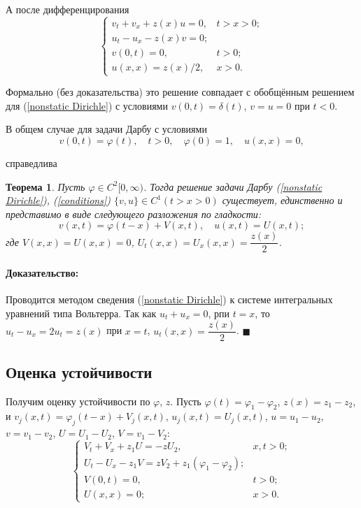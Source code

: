 \documentclass{article}
\newtheorem{theorem}{Теорема}
\newenvironment{proof}{\paragraph{Доказательство:}}{\hfill$\blacksquare$}
\begin{document}
А после дифференцирования
\begin{equation*}
\begin{cases}
	v_t + v_x + z(x) u = 0, & t > x > 0;\\
	u_t - u_x - z(x) v = 0; \\
	v(0,t) = 0, & t >0;\\
	u(x,x) = z(x) /2, & x > 0.
\end{cases}
\end{equation*}

Формально (без доказательства) это решение совпадает с обобщённым решением для (\ref{nonstatic Dirichle}) с условиями $v(0,t) = \delta(t)$, $v = u =0$ при $t<0$.

В общем случае для задачи Дарбу с условиями 
\begin{equation}
	v(0,t) = \varphi(t), \quad t>0, 
	\quad \varphi(0) = 1, \quad u(x,x) = 0,
	\label{conditions}
\end{equation}

справедлива

\begin{theorem}
Пусть $\varphi \in C^2[0,\infty)$. Тогда решение задачи Дарбу (\ref{nonstatic Dirichle}), (\ref{conditions}) $\{v,u\} \in C^1(t > x >0)$ существует, единственно и представимо в виде следующего разложения по гладкости:
\begin{equation*}
 	v(x,t) = \varphi(t-x) + V(x,t), \quad u(x,t) = U(x,t);
 \end{equation*}
где $V(x,x) = U(x,x) = 0$, $U_t(x,x) = U_x(x,x) = \dfrac{z(x)}{2}$. 
\end{theorem}
\begin{proof}
Проводится методом сведения (\ref{nonstatic Dirichle}) к системе интегральных уравнений типа Вольтерра.
Так как $u_t + u_x = 0$, рпи $t=x$, то $u_t - u_x = 2 u_t = z(x)$ при $x = t$, $u_t(x,x) = \dfrac{z(x)}{2}$.
\end{proof}

\subsection*{Оценка устойчивости}

Получим оценку устойчивости по $\varphi$, $z$.
Пусть $\varphi(t) = \varphi_1 - \varphi_2$, $z(x) = z_1 - z_2$, и $v_j(x,t) = \varphi_j(t-x) + V_j(x,t)$, $ u_j(x,t) = U_j(x,t)$, $u = u_1 -u_2$, $v = v_1 -v_2$, $U = U_1 - U_2$, $V = v_1 - V_2$:
\begin{equation*}
\begin{cases}
	V_t + V_x + z_1 U = - z U_2, & x,t>0;\\
	U_t - U_x - z_1 V = z V_2 + z_1(\varphi_1 - \varphi_2);\\
	V(0,t) = 0, & t > 0;\\
	U(x,x) = 0; & x> 0.
\end{cases}
\end{equation*}
\end{document}
